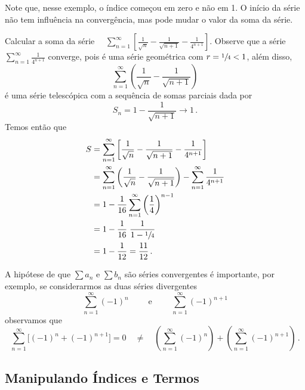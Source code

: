Note que, nesse exemplo, o índice começou em zero e não em 1. O início da série não tem
influência na convergência, mas pode mudar o valor da soma da série.

\begin{example}
  Calcular a soma da série
  \(\quad
    \sum_{n=1}^\infty\left[ \frac{1}{\sqrt{n}}
                          - \frac{1}{\sqrt{n+1}}
                          - \frac{1}{4^{n+1}}\right]
  \).
  \solution
  Observe que a série
  \(
    \sum_{n=1}^\infty\frac{1}{4^{n+1}}
  \)
  converge,
  pois é uma série geométrica com $r=\sfrac{1}{4}<1$, além disso,
  \[
    \sum_{n=1}^\infty\left(\frac{1}{\sqrt{n}}-\frac{1}{\sqrt{n+1}}\right)
  \]
  é uma série telescópica com a sequência de somas parciais dada por
  \[
    S_n = 1-\frac{1}{\sqrt{n+1}} \to 1  \,.
  \]
  Temos então que
  \begin{align*}
  	S & = \sum_{n=1}^\infty \left[\frac{1}{\sqrt{n}}-\frac{1}{\sqrt{n+1}}-\frac{1}{4^{n+1}}\right] \\
  	  & = \sum_{n=1}^\infty\left(\frac{1}{\sqrt{n}}-\frac{1}{\sqrt{n+1}}\right)
  	    - \sum_{n=1}^\infty\frac{1}{4^{n+1}}                            \\
  	  & = 1-\frac{1}{16}\sum_{n=1}^\infty\left(\frac{1}{4}\right)^{n-1} \\
  	  & = 1-\frac{1}{16}\;\frac{1}{1-\sfrac{1}{4}}                      \\
  	  & = 1 - \frac{1}{12} = \frac{11}{12}                              \,.
  \end{align*}
\end{example}

A hipótese de que $\sum a_n$ e $\sum b_n$ são séries convergentes é importante,
por exemplo, se considerarmos as duas séries divergentes
\[
  \sum_{n=1}^\infty (-1)^n
  \qquad \text{ e } \qquad
  \sum_{n=1}^\infty (-1)^{n+1}
\]
observamos que
\[
  \sum_{n=1}^\infty\big[(-1)^n+(-1)^{n+1}\big] = 0
  \quad\neq\quad
  \left(\sum_{n=1}^\infty (-1)^n\right) +
  \left(\sum_{n=1}^\infty (-1)^{n+1}\right)    \,.
\]

\subsection*{Manipulando Índices e Termos}

